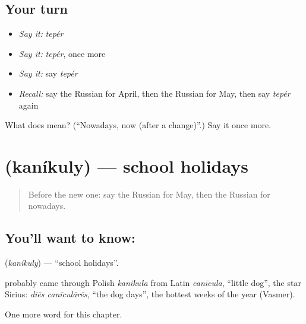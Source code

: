 \subsection*{Your turn}
\begin{itemize}
\raggedright
  \item \emph{Say it:} \emph{tepér}
  \item \emph{Say it:} \emph{tepér}, once more
  \item \emph{Say it:} say \emph{tepér}
  \item \emph{Recall:} say the Russian for April, then the Russian for May, then say \emph{tepér} again
\end{itemize}

\begin{tcolorbox}[breakable,colback=teal!4,colframe=teal!35!black,title={Before you move on}]
What does  mean? (\textquotedblleft{}Nowadays, now (after a change)\textquotedblright{}.) Say it once more.
\end{tcolorbox}
\section[\texorpdfstring{\ru{каникулы} (kaníkuly)}{каникулы (kaníkuly)}]{ (kaníkuly) — school holidays}

\label{lesson:RU-C182-kanikuly}



\begin{quote}
Before the new one: say the Russian for May, then the Russian for nowadays.
\end{quote}

\subsection*{You'll want to know: }
\textbf{} (\emph{kaníkuly}) — \textquotedblleft{}school holidays\textquotedblright{}.

\begin{cousinweb}
\textbf{} probably came through Polish \emph{kanikuła} from Latin \emph{canīcula}, \textquotedblleft{}little dog\textquotedblright{}, the star Sirius: \emph{diēs canīculārēs}, \textquotedblleft{}the dog days\textquotedblright{}, the hottest weeks of the year (Vasmer).
\end{cousinweb}

\begin{grammarlens}[title={What you've built}]
One more word for this chapter.
\end{grammarlens}

